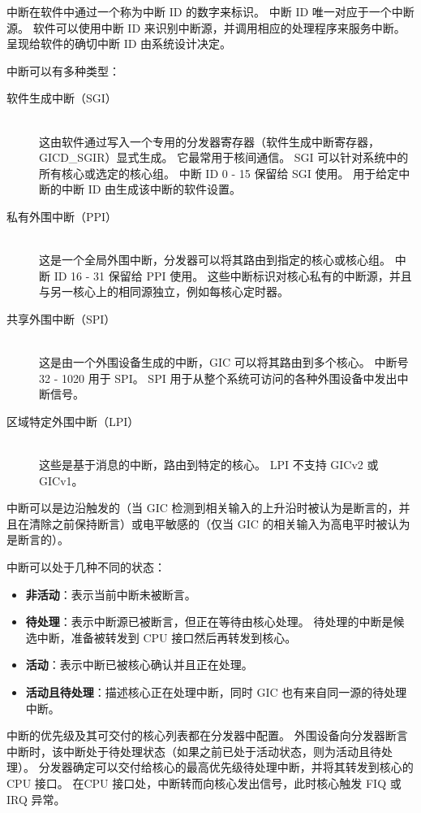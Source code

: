 中断在软件中通过一个称为中断 ID 的数字来标识。
中断 ID 唯一对应于一个中断源。
软件可以使用中断 ID 来识别中断源，并调用相应的处理程序来服务中断。
呈现给软件的确切中断 ID 由系统设计决定。

中断可以有多种类型：

\begin{description}
  \item[{软件生成中断（SGI）}] \hfill \\
    这由软件通过写入一个专用的分发器寄存器（软件生成中断寄存器，GICD\_SGIR）显式生成。
    它最常用于核间通信。
    SGI 可以针对系统中的所有核心或选定的核心组。
    中断 ID 0 - 15 保留给 SGI 使用。
    用于给定中断的中断 ID 由生成该中断的软件设置。
  \item[{私有外围中断（PPI）}] \hfill \\
    这是一个全局外围中断，分发器可以将其路由到指定的核心或核心组。
    中断 ID 16 - 31 保留给 PPI 使用。
    这些中断标识对核心私有的中断源，并且与另一核心上的相同源独立，例如每核心定时器。
  \item[{共享外围中断（SPI）}] \hfill \\
    这是由一个外围设备生成的中断，GIC 可以将其路由到多个核心。
    中断号 32 - 1020 用于 SPI。
    SPI 用于从整个系统可访问的各种外围设备中发出中断信号。
  \item[{区域特定外围中断（LPI）}] \hfill \\
    这些是基于消息的中断，路由到特定的核心。
    LPI 不支持 GICv2 或 GICv1。
\end{description}

中断可以是边沿触发的（当 GIC 检测到相关输入的上升沿时被认为是断言的，并且在清除之前保持断言）或电平敏感的（仅当 GIC 的相关输入为高电平时被认为是断言的）。

中断可以处于几种不同的状态：

\begin{itemize}
\item
  \textbf{非活动}：表示当前中断未被断言。
\item
  \textbf{待处理}：表示中断源已被断言，但正在等待由核心处理。
  待处理的中断是候选中断，准备被转发到 CPU 接口然后再转发到核心。
\item
  \textbf{活动}：表示中断已被核心确认并且正在处理。
\item
  \textbf{活动且待处理}：描述核心正在处理中断，同时 GIC 也有来自同一源的待处理中断。
\end{itemize}

中断的优先级及其可交付的核心列表都在分发器中配置。
外围设备向分发器断言中断时，该中断处于待处理状态（如果之前已处于活动状态，则为活动且待处理）。
分发器确定可以交付给核心的最高优先级待处理中断，并将其转发到核心的 CPU 接口。
在CPU 接口处，中断转而向核心发出信号，此时核心触发 FIQ 或 IRQ 异常。

